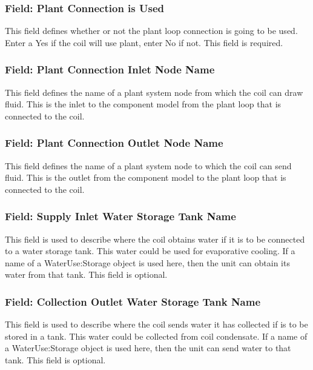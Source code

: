 \subsubsection{Field: Plant Connection is Used}\label{field-plant-connection-is-used}

This field defines whether or not the plant loop connection is going to be used. Enter a Yes if the coil will use plant, enter No if not. This field is required.

\subsubsection{Field: Plant Connection Inlet Node Name}\label{field-plant-connection-inlet-node-name}

This field defines the name of a plant system node from which the coil can draw fluid. This is the inlet to the component model from the plant loop that is connected to the coil.

\subsubsection{Field: Plant Connection Outlet Node Name}\label{field-plant-connection-outlet-node-name}

This field defines the name of a plant system node to which the coil can send fluid. This is the outlet from the component model to the plant loop that is connected to the coil.

\subsubsection{Field: Supply Inlet Water Storage Tank Name}\label{field-supply-inlet-water-storage-tank-name-2}

This field is used to describe where the coil obtains water if it is to be connected to a water storage tank. This water could be used for evaporative cooling. If a name of a WaterUse:Storage object is used here, then the unit can obtain its water from that tank. This field is optional.

\subsubsection{Field: Collection Outlet Water Storage Tank Name}\label{field-collection-outlet-water-storage-tank-name-2}

This field is used to describe where the coil sends water it has collected if is to be stored in a tank. This water could be collected from coil condensate. If a name of a WaterUse:Storage object is used here, then the unit can send water to that tank. This field is optional.

